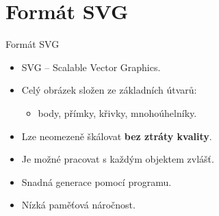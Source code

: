 \section{Formát SVG}

\begin{frame}[t,fragile]{Formát SVG}
    \begin{itemize}
        \item SVG -- Scalable Vector Graphics.
        \item Celý obrázek složen ze základních útvarů:
        \begin{itemize}
            \item body, přímky, křivky, mnohoúhelníky.
        \end{itemize}
        \item Lze neomezeně škálovat \textbf{bez ztráty kvality}.
        \item Je možné pracovat s každým objektem zvlášť.
        \item Snadná generace pomocí programu.  
        \item Nízká paměťová náročnost.
    \end{itemize}
\end{frame}

